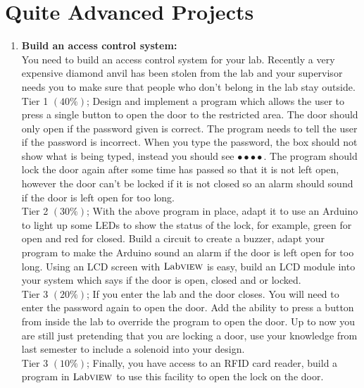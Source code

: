 \section{Quite Advanced Projects}
\begin{enumerate}
	\item \textbf{Build an access control system:}\\
	You need to build an access control system for your lab. Recently a very expensive diamond anvil has been stolen from the lab and your supervisor needs you to make sure that people who don't belong in the lab stay outside. \\
	
	Tier 1 $\left(40\%\right)$; Design and implement a program which allows the user to press a single button to open the door to the restricted area. The door should only open if the password given is correct. The program needs to tell the user if the password is incorrect. When you type the password, the box should not show what is being typed, instead you should see $\bullet\bullet\bullet\bullet$. The program should lock the door again after some time has passed so that it is not left open, however the door can't be locked if it is not closed so an alarm should sound if the door is left open for too long.\\
	
	 Tier 2 $\left(30\%\right)$; With the above program in place, adapt it to use an Arduino to light up some LEDs to show the status of the lock, for example, green for open and red for closed. Build a circuit to create a buzzer, adapt your program to make the Arduino sound an alarm if the door is left open for too long. Using an LCD screen with $\text{Lab}\textsc{view}$ is easy, build an LCD module into your system which says if the door is open, closed and or locked.\\
	 
	  Tier 3 $\left(20\%\right)$; If you enter the lab and the door closes. You will need to enter the password again to open the door. Add the ability to press a button from inside the lab to override the program to open the door. Up to now you are still just pretending that you are locking a door, use your knowledge from last semester to include a solenoid into your design.\\
	  
	  Tier 3 $\left(10\%\right)$; Finally, you have access to an RFID card reader, build a program in $\text{Lab}\textsc{view}$ to use this facility to open the lock on the door.\\
	  

\end{enumerate}
